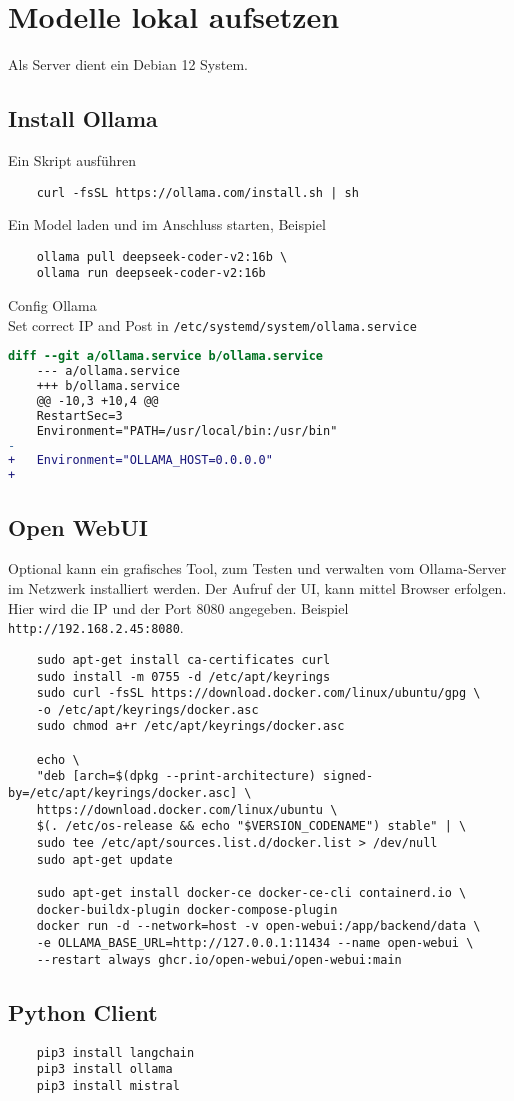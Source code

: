 \section{Modelle lokal aufsetzen}
Als Server dient ein Debian 12 System.

\subsection{Install Ollama}
Ein Skript ausführen
\begin{verbatim}
	curl -fsSL https://ollama.com/install.sh | sh
\end{verbatim}

Ein Model laden und im Anschluss starten, Beispiel
\begin{verbatim}
	ollama pull deepseek-coder-v2:16b \
	ollama run deepseek-coder-v2:16b
\end{verbatim}


Config Ollama\\
Set correct IP and Post in \texttt{/etc/systemd/system/ollama.service}

\begin{lstlisting}[language=diff,caption={Ollama Hostanpasssng für Netzwerkbetrieb}]
	diff --git a/ollama.service b/ollama.service
	--- a/ollama.service
	+++ b/ollama.service
	@@ -10,3 +10,4 @@
	RestartSec=3
	Environment="PATH=/usr/local/bin:/usr/bin"
-   
+   Environment="OLLAMA_HOST=0.0.0.0"
+   
\end{lstlisting}



\subsection{Open WebUI}
Optional kann ein grafisches Tool, zum Testen und verwalten vom Ollama-Server im Netzwerk installiert werden. Der Aufruf der UI, kann mittel Browser erfolgen. Hier wird die IP und der Port 8080 angegeben. Beispiel \texttt{http://192.168.2.45:8080}.

\begin{verbatim}
	sudo apt-get install ca-certificates curl
	sudo install -m 0755 -d /etc/apt/keyrings
	sudo curl -fsSL https://download.docker.com/linux/ubuntu/gpg \
	-o /etc/apt/keyrings/docker.asc
	sudo chmod a+r /etc/apt/keyrings/docker.asc
	
	echo \
	"deb [arch=$(dpkg --print-architecture) signed-by=/etc/apt/keyrings/docker.asc] \
	https://download.docker.com/linux/ubuntu \
	$(. /etc/os-release && echo "$VERSION_CODENAME") stable" | \
	sudo tee /etc/apt/sources.list.d/docker.list > /dev/null
	sudo apt-get update
	
	sudo apt-get install docker-ce docker-ce-cli containerd.io \
	docker-buildx-plugin docker-compose-plugin
	docker run -d --network=host -v open-webui:/app/backend/data \
	-e OLLAMA_BASE_URL=http://127.0.0.1:11434 --name open-webui \
	--restart always ghcr.io/open-webui/open-webui:main
\end{verbatim}

\subsection{Python Client}

\begin{verbatim}
	pip3 install langchain
	pip3 install ollama
	pip3 install mistral
\end{verbatim}